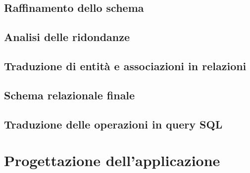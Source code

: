 \documentclass[a4paper,12pt]{report}
\begin{document}
\section{Raffinamento dello schema}
\section{Analisi delle ridondanze}
\section{Traduzione di entità e associazioni in relazioni}


\section{Schema relazionale finale}
\newpage
\section{Traduzione delle operazioni in query SQL}

\newpage
\chapter{Progettazione dell'applicazione}
\end{document}

